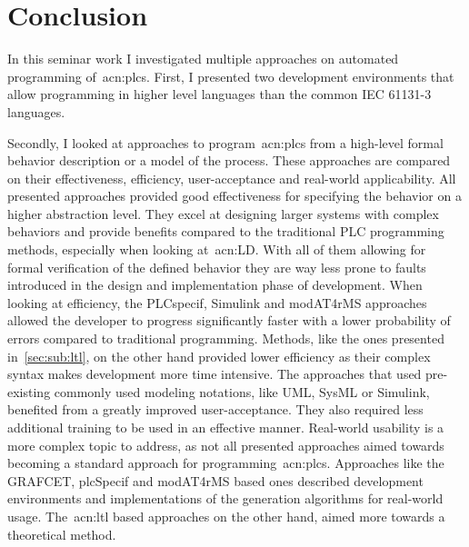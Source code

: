 \chapter{Conclusion}
\label{sec:conclusion}

In this seminar work I investigated multiple approaches on automated programming of~\acrlong{acn:plc}s.
First, I presented two development environments that allow programming in higher level languages than the common IEC 61131-3 languages.

Secondly, I looked at approaches to program~\acrshort{acn:plc}s from a high-level formal behavior description or a model of the process.
These approaches are compared on their effectiveness, efficiency, user-acceptance and real-world applicability.
All presented approaches provided good effectiveness for specifying the behavior on a higher abstraction level.
They excel at designing larger systems with complex behaviors and provide benefits compared to the traditional PLC programming methods, especially when looking at~\acrshort{acn:LD}.
With all of them allowing for formal verification of the defined behavior they are way less prone to faults introduced in the design and implementation phase of development.
When looking at efficiency, the PLCspecif, Simulink and modAT4rMS approaches allowed the developer to progress significantly faster with a lower probability of errors compared to traditional programming.
Methods, like the ones presented in~\ref{sec:sub:ltl}, on the other hand provided lower efficiency as their complex syntax makes development more time intensive.
The approaches that used pre-existing commonly used modeling notations, like UML, SysML or Simulink, benefited from a greatly improved user-acceptance.
They also required less additional training to be used in an effective manner.
Real-world usability is a more complex topic to address, as not all presented approaches aimed towards becoming a standard approach for programming~\acrshort{acn:plc}s.
Approaches like the GRAFCET,  plcSpecif and modAT4rMS based ones described development environments and implementations of the generation algorithms for real-world usage.
The~\acrshort{acn:ltl} based approaches on the other hand, aimed more towards a theoretical method.


